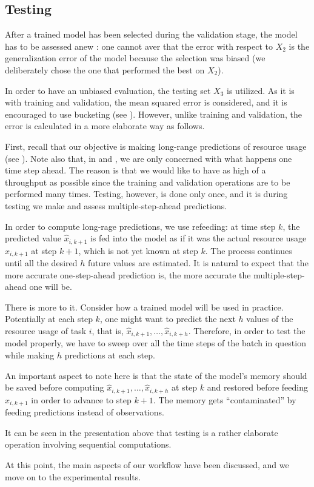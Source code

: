 \subsection{Testing} 
After a trained model has been selected during the validation stage, the model
has to be assessed anew \cite{hastie2009}: one cannot aver that the error with
respect to $X_2$ is the generalization error of the model because the selection
was biased (we deliberately chose the one that performed the best on $X_2$).

In order to have an unbiased evaluation, the testing set $X_3$ is utilized. As
it is with training and validation, the mean squared error is considered, and it
is encouraged to use bucketing (see ). However, unlike training
and validation, the error is calculated in a more elaborate way as follows.

First, recall that our objective is making long-range predictions of resource
usage (see ). Note also that, in  and
, we are only concerned with what happens one time step ahead.
The reason is that we would like to have as high of a throughput as possible
since the training and validation operations are to be performed many times.
Testing, however, is done only once, and it is during testing we make and assess
multiple-step-ahead predictions.

In order to compute long-rage predictions, we use refeeding: at time step $k$,
the predicted value $\hat{x}_{i,k + 1}$ is fed into the model as if it was the
actual resource usage $x_{i,k + 1}$ at step $k + 1$, which is not yet known at
step $k$. The process continues until all the desired $h$ future values are
estimated. It is natural to expect that the more accurate one-step-ahead
prediction is, the more accurate the multiple-step-ahead one will be.

There is more to it. Consider how a trained model will be used in practice.
Potentially at each step $k$, one might want to predict the next $h$ values of
the resource usage of task $i$, that is, $\hat{x}_{i,k + 1}, \dots, \hat{x}_{i,k
+ h}$. Therefore, in order to test the model properly, we have to sweep over all
the time steps of the batch in question while making $h$ predictions at each
step.

An important aspect to note here is that the state of the model's memory should
be saved before computing $\hat{x}_{i,k + 1}, \dots, \hat{x}_{i,k + h}$ at step
$k$ and restored before feeding $x_{i,k + 1}$ in order to advance to step $k +
1$. The memory gets ``contaminated'' by feeding predictions instead of
observations.

It can be seen in the presentation above that testing is a rather elaborate
operation involving sequential computations.

At this point, the main aspects of our workflow have been discussed, and we move
on to the experimental results.
